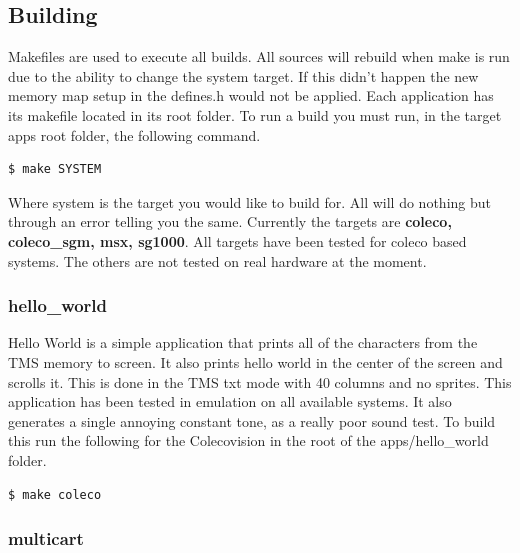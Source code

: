 \documentclass{article}
\begin{document}
  \subsection{Building}

  \par
  Makefiles are used to execute all builds. All sources will rebuild when make is run due to the ability to change the
  system target. If this didn't happen the new memory map setup in the defines.h would not be applied. Each application
  has its makefile located in its root folder. To run a build you must run, in the target apps root folder, the following
  command.

  \begin{lstlisting}[language=bash]
    $ make SYSTEM
  \end{lstlisting}

  Where system is the target you would like to build for. All will do nothing but through an error telling you the same.
  Currently the targets are \textbf{coleco, coleco\_sgm, msx, sg1000}. All targets have been tested for coleco based systems.
  The others are not tested on real hardware at the moment.

  \subsubsection{hello\_world}

  \par
  Hello World is a simple application that prints all of the characters from the TMS memory to screen. It also prints hello world in the
  center of the screen and scrolls it. This is done in the TMS txt mode with 40 columns and no sprites. This application has been
  tested in emulation on all available systems. It also generates a single annoying constant tone, as a really poor sound test. To build this
  run the following for the Colecovision in the root of the apps/hello\_world folder.

  \begin{lstlisting}[language=bash]
    $ make coleco
  \end{lstlisting}

  \subsubsection{multicart}
\end{document}
